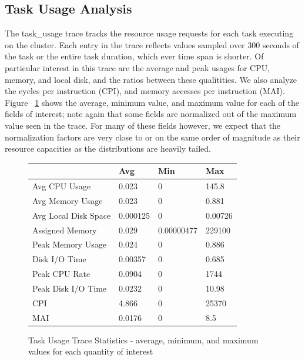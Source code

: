 \documentclass{sig-alternate}
\begin{document}



\subsection{Task Usage Analysis}

The task\_usage trace tracks the resource usage requests for each task executing on the cluster.
Each entry in the trace reflects values sampled over 300 seconds of the task or the entire task duration, which ever time span is shorter.
Of particular interest in this trace are the average and peak usages for CPU, memory, and local disk, and the ratios between these qualitities.
We also analyze the cycles per instruction (CPI), and memory accesses per instruction (MAI).
Figure ~\ref{task_usage_stats} shows the average, minimum value, and maximum value for each of the fields of interest; note again that some fields are normalized out of the maximum value seen in the trace.
For many of these fields however, we expect that the normalization factors are very close to or on the same order of magnitude as their resource capacities as the distributions are heavily tailed.

\begin{figure}
\centering
\begin{tabular}{| p{2.5cm} | p{1.5cm} | p{1.5cm} | p{1.5cm} |} \hline
 & Avg & Min & Max \\ \hline
Avg CPU Usage & 0.023 & 0 & 145.8 \\ \hline
Avg Memory Usage & 0.023 & 0 & 0.881 \\ \hline
Avg Local Disk Space & 0.000125 & 0 & 0.00726 \\ \hline
Assigned Memory & 0.029 & 0.00000477 & 229100\* \\ \hline
Peak Memory Usage & 0.024 & 0 & 0.886 \\ \hline
Disk I/O Time & 0.00357 & 0 & 0.685 \\ \hline
Peak CPU Rate & 0.0904 & 0 & 1744\* \\ \hline
Peak Disk I/O Time & 0.0232 & 0 & 10.98 \\ \hline
CPI & 4.866 & 0 & 25370\* \\ \hline
MAI & 0.0176 & 0 & 8.5\* \\ \hline
\end{tabular}
\caption{Task Usage Trace Statistics - average, minimum, and maximum values for each quantity of interest}
\label{task_usage_stats}
\end{figure}
\end{document}
